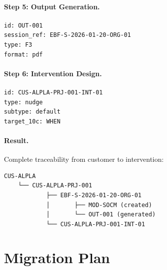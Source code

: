 \paragraph{Step 5: Output Generation.}
\begin{verbatim}
id: OUT-001
session_ref: EBF-S-2026-01-20-ORG-01
type: F3
format: pdf
\end{verbatim}

\paragraph{Step 6: Intervention Design.}
\begin{verbatim}
id: CUS-ALPLA-PRJ-001-INT-01
type: nudge
subtype: default
target_10c: WHEN
\end{verbatim}

\paragraph{Result.} Complete traceability from customer to intervention:
\begin{verbatim}
CUS-ALPLA
    └── CUS-ALPLA-PRJ-001
            ├── EBF-S-2026-01-20-ORG-01
            │       ├── MOD-SOCM (created)
            │       └── OUT-001 (generated)
            └── CUS-ALPLA-PRJ-001-INT-01
\end{verbatim}


\section{Migration Plan}
\label{sec:superkey-migration}

